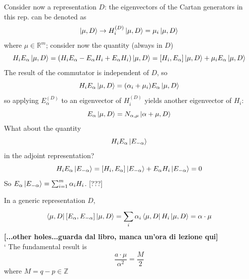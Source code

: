 Consider now a representation $D$: the eigenvectors of the Cartan generators in
this rep. can be denoted as
\[
    \ket{\mu,D}\to H_i^{(D)}\ket{\mu,D}=\mu_i\ket{\mu,D}
\]
where $\mu\in\mathbb{R}^m$; consider now the quantity (always in $D$)
\[
    H_iE_\alpha\ket{\mu,D} = (H_iE_\alpha-E_\alpha H_i+E_\alpha H_i)\ket{\mu,D}=
    \left[H_i,E_\alpha\right]\ket{\mu,D} + \mu_iE_\alpha\ket{\mu,D}
\]
The result of the commutator is independent of $D$, so
\[
    H_iE_\alpha\ket{\mu,D} = (\alpha_i+\mu_i)E_\alpha \ket{\mu,D}
\]
so applying $E^{(D)}_\alpha$ to an eigenvector of $H_i^{(D)}$ yields another
eigenvector of $H_i$:
\[
    E_\alpha \ket{\mu,D} = N_{\alpha ,\mu}\ket{\alpha +\mu,D}
\]
What about the quantity
\[
    H_iE_\alpha \ket{E_{-\alpha }}
\]
in the adjoint representation?
\[
    H_iE_\alpha \ket{E_{-\alpha}}=\left[H_i,E_\alpha\right]\ket{E_{-\alpha }}+
    E_{\alpha }H_i\ket{E_{-\alpha }} =  0
\]
So $E_\alpha \ket{E_{-\alpha}} = \sum_{i=1}^{m} \alpha _iH_i$. [???]

In a generic representation $D$,
\[
    \bra{\mu,D}\left[E_\alpha,E_{-\alpha}\right]\ket{\mu,D}=\sum_{i}^{}\alpha_i
    \bra{\mu,D}H_i\ket{\mu,D} = \alpha\cdot \mu
\]
{\large\textbf{[...other holes...guarda dal libro, manca un'ora di lezione qui]}
}\\
`
The fundamental result is
\[
    \frac{a\cdot\mu}{\alpha^2}=\frac{M}{2}
\]
where $M=q-p\in\mathbb{Z}$ 
